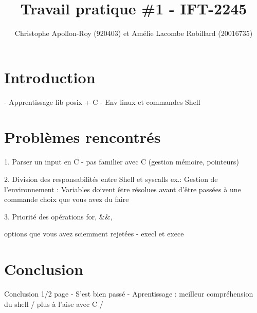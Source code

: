 \documentclass{article}
\title{Travail pratique \#1 - IFT-2245}
\author{Christophe Apollon-Roy (920403) et Amélie Lacombe Robillard (20016735)}
\begin{document}
\maketitle
\section*{ Introduction }
- Apprentissage lib posix + C
- Env linux et commandes Shell

\section*{ Problèmes rencontrés }
1. Parser un input en C - pas familier avec C (gestion mémoire, pointeurs)

2. Division des responsabilités entre Shell et syscalls 
ex.: Gestion de l'environnement : Variables doivent être résolues avant d'être passées à une commande
choix que vous avez du faire

3. Priorité des opérations for, \&\&, 

options que vous avez sciemment rejetées
- execl et exece 

\section*{ Conclusion } Conclusion 1/2 page
- S'est bien passé
- Aprentissage : meilleur compréhension du shell / plus à l'aise avec C / 
\end{document}
